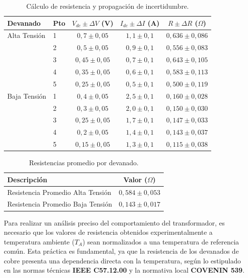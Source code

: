 \begin{table}[H]
\centering
\caption{Cálculo de resistencia y propagación de incertidumbre.}
\renewcommand{\arraystretch}{1.3}
\begin{tabular}{llccc}
\toprule
\textbf{Devanado} & \textbf{Pto} & \textbf{$V_{dc} \pm \Delta V$ (V)} & \textbf{$I_{dc} \pm \Delta I$ (A)} & \textbf{$R \pm \Delta R$ ($\Omega$)} \\ 
\midrule
Alta Tensión & 1 & $0,7 \pm 0,05$ & $1,1 \pm 0,1$ & $0,636 \pm 0,086$ \\
& 2 & $0,5 \pm 0,05$ & $0,9 \pm 0,1$ & $0,556 \pm 0,083$ \\
& 3 & $0,45 \pm 0,05$ & $0,7 \pm 0,1$ & $0,643 \pm 0,105$ \\
& 4 & $0,35 \pm 0,05$ & $0,6 \pm 0,1$ & $0,583 \pm 0,113$ \\
& 5 & $0,25 \pm 0,05$ & $0,5 \pm 0,1$ & $0,500 \pm 0,119$ \\
\midrule
Baja Tensión & 1 & $0,4 \pm 0,05$ & $2,5 \pm 0,1$ & $0,160 \pm 0,028$ \\
& 2 & $0,3 \pm 0,05$ & $2,0 \pm 0,1$ & $0,150 \pm 0,030$ \\
& 3 & $0,25 \pm 0,05$ & $1,7 \pm 0,1$ & $0,147 \pm 0,033$ \\
& 4 & $0,2 \pm 0,05$ & $1,4 \pm 0,1$ & $0,143 \pm 0,037$ \\
& 5 & $0,15 \pm 0,05$ & $1,3 \pm 0,1$ & $0,115 \pm 0,038$ \\
\bottomrule
\end{tabular}
\end{table}


\begin{table}[H]
\centering
\caption{Resistencias promedio por devanado.}
\renewcommand{\arraystretch}{1.3} %
\begin{tabular}{lc}
\toprule
\textbf{Descripción} & \textbf{Valor ($\Omega$)} \\ 
\midrule
Resistencia Promedio Alta Tensión & $0,584 \pm 0,053$ \\
Resistencia Promedio Baja Tensión & $0,143 \pm 0,017$ \\
\bottomrule
\end{tabular}
\end{table}


Para realizar un análisis preciso del comportamiento del transformador, es necesario que los valores de resistencia obtenidos experimentalmente a temperatura ambiente ($T_A$) sean normalizados a una temperatura de referencia común. Esta práctica es fundamental, ya que la resistencia de los devanados de cobre presenta una dependencia directa con la temperatura, según lo estipulado en las normas técnicas \textbf{IEEE C57.12.00} y la normativa local \textbf{COVENIN 539}.

